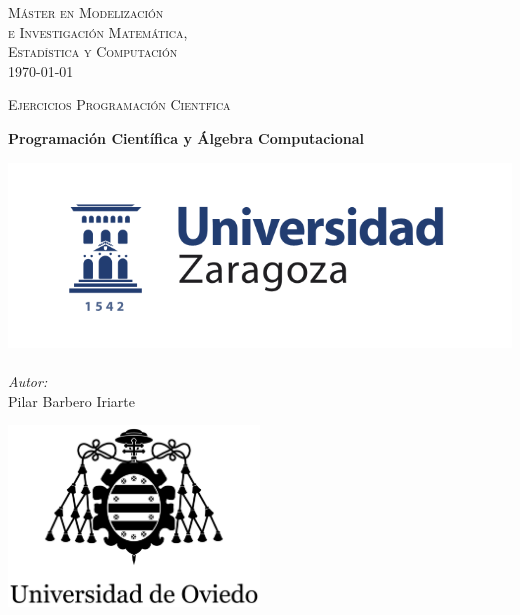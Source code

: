 \documentclass[a4paper,12pt]{article}
\author{Pilar Barbero Iriarte}
\begin{document}
\begin{titlepage}
\begin{center}



\textsc{\LARGE M\'aster en Modelizaci\'on \\e Investigaci\'on Matem\'atica,\\ Estad\'istica y Computaci\'on }\\[1.5cm]
{\large \today}

\textsc{Ejercicios Programaci\'on Cient\'fica}\\[0.5cm]

\vfill

{ \huge \bfseries Programaci\'on Cient\'ifica y \'Algebra Computacional \\[0.4cm] }

\vfill



\noindent
\begin{minipage}{0.4\textwidth}
\begin{flushleft} \large
\includegraphics[width=1.1\textwidth]{../images/logoUZ.png}~\\
\emph{Autor:}\\
Pilar Barbero Iriarte 
\end{flushleft}
\end{minipage}%
\begin{minipage}{0.4\textwidth}
\begin{flushright} \large
\includegraphics[width=0.5\textwidth]{../images/logoUNIOVI.png}~\\


\end{flushright}
\end{minipage}
\end{center}
\end{titlepage}
\end{document}
